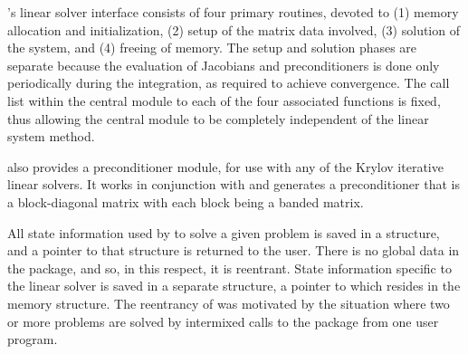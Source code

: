 {\ida}'s linear solver interface consists of four primary routines,
devoted to (1) memory allocation and initialization, (2) setup of the
matrix data involved, (3) solution of the system, and (4) freeing of memory.  
The setup and solution phases are separate because the evaluation of
Jacobians and preconditioners is done only periodically during the
integration, as required to achieve convergence. The call list within
the central {\ida} module to each of the four associated functions is
fixed, thus allowing the central module to be completely independent
of the linear system method.

{\ida} also provides a preconditioner module, {\idabbdpre} for use
with any of the Krylov iterative linear solvers.  It works in
conjunction with {\nvecp} and generates a preconditioner that is a  
block-diagonal matrix with each block being a banded matrix.

All state information used by {\ida} to solve a given problem is saved
in a structure, and a pointer to that structure is returned to the
user.  There is no global data in the {\ida} package, and so, in this
respect, it is reentrant. State information specific to the linear
solver is saved in a separate structure, a pointer to which resides in
the {\ida} memory structure. The reentrancy of {\ida} was motivated
by the situation where two or more problems are solved by
intermixed calls to the package from one user program.
